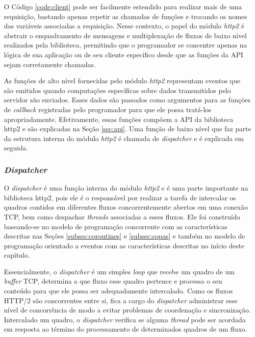 O Código \ref{code:client} pode ser facilmente estendido para realizar mais de uma requisição, bastando apenas repetir as chamadas de funções e trocando os nomes das variáveis associadas a requisição. Nesse contexto, o papel do módulo {\em http2} é abstrair o enquadramento de mensagens e multiplexação de fluxos de baixo nível realizados pela biblioteca, permitindo que o programador se concentre apenas na lógica de sua aplicação ou de seu cliente específico desde que as funções da API sejam corretamente chamadas.

As funções de alto nível fornecidas pelo módulo {\em http2} representam eventos que são emitidos quando computações específicas sobre dados transmitidos pelo servidor são enviados. Esses dados são passados como argumentos para as funções de {\em callback} registradas pelo programador para que ele possa tratá-los apropriadamente. Efetivamente, essas funções compõem a API da biblioteca http2 e são explicadas na Seção \ref{sec:api}. Uma função de baixo nível que faz parte da estrutura interna do módulo {\em http2} é chamada de {\em dispatcher} e é explicada em seguida.

\subsubsection{{\em Dispatcher}}

O {\em dispatcher} é uma função interna do módulo {\em http2} e é uma parte importante na biblioteca http2, pois ele é o responsável por realizar a tarefa de intercalar os quadros contidos em diferentes fluxos concorrentemente abertos em uma conexão TCP, bem como despachar {\em threads} associadas a esses fluxos. Ele foi construído baseando-se no modelo de programação concorrente com as características descritas nas Seções \ref{subsec:coroutines} e \ref{subsec:copas} e também no modelo de programação orientado a eventos com as características descritas no início deste capítulo.

Essencialmente, o {\em dispatcher} é um simples {\em loop} que recebe um quadro de um {\em buffer} TCP, determina a que fluxo esse quadro pertence e processa o seu conteúdo para que ele possa ser adequadamente intercalado. Como os fluxos HTTP/2 são concorrentes entre si, fica a cargo do {\em dispatcher} administrar esse nível de concorrência de modo a evitar problemas de coordenação e sincronização. Intercalado um quadro, o {\em dispatcher} verifica se alguma {\em thread} pode ser acordada em resposta ao término do processamento de determinados quadros de um fluxo.

